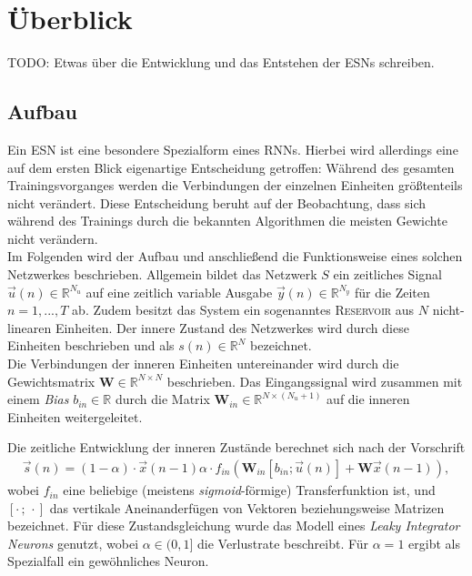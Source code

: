 \section{Überblick}
\textsc{TODO}: Etwas über die Entwicklung und das Entstehen der ESNs schreiben.

\subsection{Aufbau}
Ein \textsc{ESN} ist eine besondere Spezialform eines \textsc{RNN}s. Hierbei wird allerdings eine auf dem ersten Blick eigenartige Entscheidung getroffen: Während des gesamten Trainingsvorganges werden die Verbindungen der einzelnen Einheiten größtenteils nicht verändert. Diese Entscheidung beruht auf der Beobachtung, dass sich während des Trainings durch die bekannten Algorithmen die meisten Gewichte nicht verändern.\\

Im Folgenden wird der Aufbau und anschließend die Funktionsweise eines solchen Netzwerkes beschrieben.
Allgemein bildet das Netzwerk $S$ ein zeitliches Signal $\vec{u}(n) \in \mathbb{R}^{N_u}$  auf eine zeitlich variable Ausgabe $\vec{y}(n) \in \mathbb{R}^{N_y}$ für die Zeiten $n=1, ..., T$ ab. Zudem besitzt das System ein sogenanntes \textsc{Reservoir} aus $N$ nicht-linearen Einheiten. Der innere Zustand des Netzwerkes wird durch diese Einheiten beschrieben und als $s(n) \in \mathbb{R}^{N}$ bezeichnet.\\
Die Verbindungen der inneren Einheiten untereinander wird durch die Gewichtsmatrix $\mathbf{W} \in \mathbb{R}^{N \times N}$ beschrieben. Das Eingangssignal wird zusammen mit einem \textit{Bias} $b_{in} \in \mathbb{R}$ durch die Matrix $\mathbf{W}_{in} \in \mathbb{R}^{N \times (N_u+1)}$ auf die inneren Einheiten weitergeleitet.

Die zeitliche Entwicklung der inneren Zustände berechnet sich nach der Vorschrift
\begin{align}
\vec{s}(n) = (1 - \alpha) \cdot \vec{x}(n-1)  \alpha \cdot f_{in}\left( \mathbf{W}_{in} [b_{in}; \vec{u}(n)] + \mathbf{W} \vec{x}(n-1) \right),
\end{align}
wobei $f_{in}$ eine beliebige (meistens \textit{sigmoid}-förmige) Transferfunktion ist, und $[\cdot\,;\,\cdot]$ das vertikale Aneinanderfügen von Vektoren beziehungsweise Matrizen bezeichnet. Für diese Zustandsgleichung wurde das Modell eines \textit{Leaky Integrator Neurons} genutzt, wobei $\alpha \in (0,1]$ die Verlustrate beschreibt. Für $\alpha=1$ ergibt als Spezialfall ein gewöhnliches Neuron.\\

